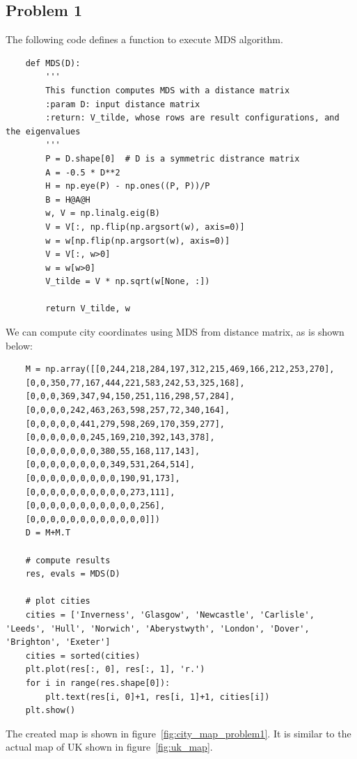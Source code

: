\documentclass{article}
\begin{document}
\subsection*{Problem 1}
The following code defines a function to execute MDS algorithm.
\begin{lstlisting}
	def MDS(D):
		'''
		This function computes MDS with a distance matrix
		:param D: input distance matrix
		:return: V_tilde, whose rows are result configurations, and the eigenvalues
		'''
		P = D.shape[0]  # D is a symmetric distrance matrix
		A = -0.5 * D**2
		H = np.eye(P) - np.ones((P, P))/P
		B = H@A@H
		w, V = np.linalg.eig(B)
		V = V[:, np.flip(np.argsort(w), axis=0)]
		w = w[np.flip(np.argsort(w), axis=0)]
		V = V[:, w>0]
		w = w[w>0]
		V_tilde = V * np.sqrt(w[None, :])

        return V_tilde, w
\end{lstlisting}
We can compute city coordinates using MDS from distance matrix, as is shown below:
\begin{lstlisting}
	M = np.array([[0,244,218,284,197,312,215,469,166,212,253,270],
	[0,0,350,77,167,444,221,583,242,53,325,168],
	[0,0,0,369,347,94,150,251,116,298,57,284],
	[0,0,0,0,242,463,263,598,257,72,340,164],
	[0,0,0,0,0,441,279,598,269,170,359,277],
	[0,0,0,0,0,0,245,169,210,392,143,378],
	[0,0,0,0,0,0,0,380,55,168,117,143],
	[0,0,0,0,0,0,0,0,349,531,264,514],
	[0,0,0,0,0,0,0,0,0,190,91,173],
	[0,0,0,0,0,0,0,0,0,0,273,111],
	[0,0,0,0,0,0,0,0,0,0,0,256],
	[0,0,0,0,0,0,0,0,0,0,0,0]])
	D = M+M.T

	# compute results
	res, evals = MDS(D)

	# plot cities
	cities = ['Inverness', 'Glasgow', 'Newcastle', 'Carlisle', 'Leeds', 'Hull', 'Norwich', 'Aberystwyth', 'London', 'Dover', 'Brighton', 'Exeter']
	cities = sorted(cities)
	plt.plot(res[:, 0], res[:, 1], 'r.')
	for i in range(res.shape[0]):
		plt.text(res[i, 0]+1, res[i, 1]+1, cities[i])
	plt.show()
\end{lstlisting}
The created map is shown in figure~\ref{fig:city_map_problem1}. It is similar to the actual map of UK shown in figure~\ref{fig:uk_map}.
\end{document}
